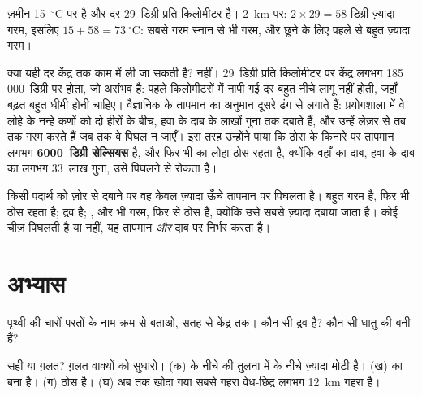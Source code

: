 \begin{example}[दो किलोमीटर नीचे]\label{ex:g6:inside-the-earth:two-km}
ज़मीन 15~$^\circ$C पर है और दर 29~डिग्री प्रति किलोमीटर है।
2~km पर: $2 \times 29 = 58$ डिग्री ज़्यादा गरम, इसलिए $15 + 58 = 73~^\circ$C:
सबसे गरम स्नान से भी गरम, और छूने के लिए पहले से बहुत ज़्यादा गरम।
\end{example}

क्या यही दर केंद्र तक काम में ली जा सकती है? नहीं। 29~डिग्री प्रति
किलोमीटर पर केंद्र लगभग 185\,000~डिग्री पर होता, जो
असंभव है: पहले किलोमीटरों में नापी गई दर बहुत नीचे लागू नहीं होती, जहाँ बढ़त बहुत धीमी होनी चाहिए। वैज्ञानिक  के तापमान का
अनुमान दूसरे ढंग से लगाते हैं: प्रयोगशाला में वे लोहे के नन्हे कणों को दो हीरों के
बीच, हवा के दाब के लाखों गुना तक दबाते हैं,
और उन्हें लेज़र से तब तक गरम करते हैं जब तक वे पिघल न जाएँ। इस तरह उन्होंने पाया कि
ठोस  के किनारे पर तापमान लगभग
\textbf{6000~डिग्री सेल्सियस} है, और फिर भी  का लोहा ठोस रहता है, क्योंकि वहाँ का दाब, हवा के दाब का लगभग
33~लाख गुना, उसे पिघलने से रोकता है।

\begin{remark}[गरम, फिर भी ठोस]\label{rem:g6:inside-the-earth:pressure}
किसी पदार्थ को ज़ोर से दबाने पर वह केवल ज़्यादा ऊँचे तापमान पर पिघलता है।
 बहुत गरम है, फिर भी ठोस रहता है;  द्रव है; , और भी गरम, फिर से ठोस है, क्योंकि उसे सबसे ज़्यादा दबाया जाता है।
कोई चीज़ पिघलती है या नहीं, यह तापमान \emph{और} दाब पर निर्भर करता है।
\end{remark}

\section{अभ्यास}

\begin{exercise}[$\star$]\label{exo:g6:inside-the-earth:1}
पृथ्वी की चारों परतों के नाम क्रम से बताओ, सतह से
केंद्र तक। कौन-सी द्रव है? कौन-सी धातु की बनी हैं?
\end{exercise}

\begin{exercise}[$\star$]\label{exo:g6:inside-the-earth:2}
सही या ग़लत? ग़लत वाक्यों को सुधारो।
(क)   के नीचे की तुलना में  के नीचे ज़्यादा मोटी है।
(ख)   का बना है।
(ग)  ठोस है।
(घ) अब तक खोदा गया सबसे गहरा वेध-छिद्र लगभग 12~km गहरा है।
\end{exercise}

